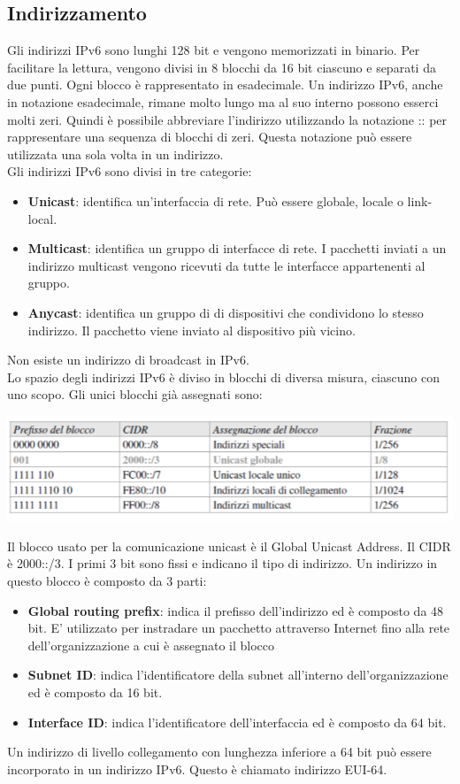 \documentclass[12pt]{report}
\begin{document}
\subsection{Indirizzamento}
Gli indirizzi IPv6 sono lunghi 128 bit e vengono memorizzati in binario. Per facilitare la lettura, vengono divisi in 8 blocchi da 16 bit ciascuno e separati da due punti. Ogni blocco è rappresentato in esadecimale. Un indirizzo IPv6, anche in notazione esadecimale, rimane molto lungo ma al suo interno possono esserci molti zeri. Quindi è possibile abbreviare l'indirizzo utilizzando la notazione :: per rappresentare una sequenza di blocchi di zeri. Questa notazione può essere utilizzata una sola volta in un indirizzo.
\vspace{\baselineskip}\\
Gli indirizzi IPv6 sono divisi in tre categorie:
\begin{itemize}
	\item \textbf{Unicast}: identifica un'interfaccia di rete. Può essere globale, locale o link-local.
	\item \textbf{Multicast}: identifica un gruppo di interfacce di rete. I pacchetti inviati a un indirizzo multicast vengono ricevuti da tutte le interfacce appartenenti al gruppo.
	\item \textbf{Anycast}: identifica un gruppo di di dispositivi che condividono lo stesso indirizzo. Il pacchetto viene inviato al dispositivo più vicino.
\end{itemize}
Non esiste un indirizzo di broadcast in IPv6.
\vspace{\baselineskip}\\
Lo spazio degli indirizzi IPv6 è diviso in blocchi di diversa misura, ciascuno con uno scopo. Gli unici blocchi già assegnati sono:
\begin{center}
	\includegraphics[scale=0.35]{assets/ipv6_blocks.png}
\end{center}
Il blocco usato per la comunicazione unicast è il Global Unicast Address. Il CIDR è 2000::/3. I primi 3 bit sono fissi e indicano il tipo di indirizzo. Un indirizzo in questo blocco è composto da 3 parti:
\begin{itemize}
	\item \textbf{Global routing prefix}: indica il prefisso dell'indirizzo ed è composto da 48 bit. E' utilizzato per instradare un pacchetto attraverso Internet fino alla rete dell'organizzazione a cui è assegnato il blocco
	\item \textbf{Subnet ID}: indica l'identificatore della subnet all'interno dell'organizzazione ed è composto da 16 bit.
	\item \textbf{Interface ID}: indica l'identificatore dell'interfaccia ed è composto da 64 bit.
\end{itemize}
Un indirizzo di livello collegamento con lunghezza inferiore a 64 bit può essere incorporato in un indirizzo IPv6. Questo è chiamato indirizzo EUI-64.
\end{document}
